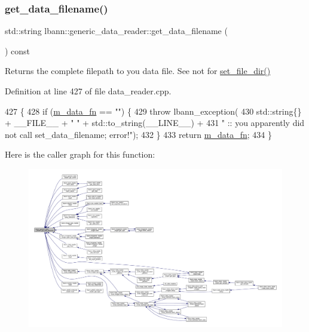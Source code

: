 \subsubsection{\texorpdfstring{get\+\_\+data\+\_\+filename()}{get\_data\_filename()}}
{\footnotesize\ttfamily std\+::string lbann\+::generic\+\_\+data\+\_\+reader\+::get\+\_\+data\+\_\+filename (\begin{DoxyParamCaption}{ }\end{DoxyParamCaption}) const}

Returns the complete filepath to you data file. See not for \hyperlink{classlbann_1_1generic__data__reader_a94a6db0b62d4c98202ef309eb76b220c}{set\+\_\+file\+\_\+dir()} 

Definition at line 427 of file data\+\_\+reader.\+cpp.


\begin{DoxyCode}
427                                                        \{
428   \textcolor{keywordflow}{if} (\hyperlink{classlbann_1_1generic__data__reader_a2595e254ab2442e8cfc80aa6bdac0c0f}{m\_data\_fn} == \textcolor{stringliteral}{""}) \{
429     \textcolor{keywordflow}{throw} lbann\_exception(
430       std::string\{\} + \_\_FILE\_\_ + \textcolor{stringliteral}{" "} + std::to\_string(\_\_LINE\_\_) +
431       \textcolor{stringliteral}{" :: you apparently did not call set\_data\_filename; error!"});
432   \}
433   \textcolor{keywordflow}{return} \hyperlink{classlbann_1_1generic__data__reader_a2595e254ab2442e8cfc80aa6bdac0c0f}{m\_data\_fn};
434 \}
\end{DoxyCode}
Here is the caller graph for this function\+:\nopagebreak
\begin{figure}[H]
\begin{center}
\leavevmode
\includegraphics[width=350pt]{classlbann_1_1generic__data__reader_a56664e1b43f3fe923cf6d652f14b40a9_icgraph}
\end{center}
\end{figure}
\mbox{\label{classlbann_1_1generic__data__reader_a2f1f018beecb1295c00a1ffdfa03f638}} 
